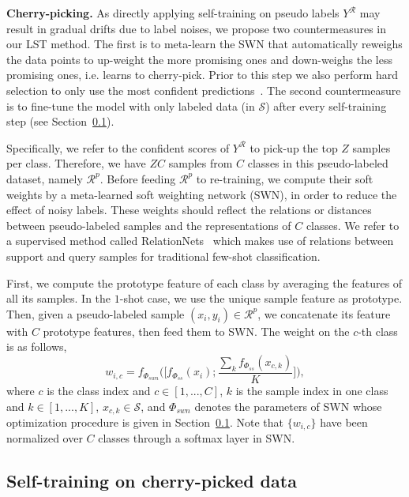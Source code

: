 \documentclass{article}
\newcommand{\myparagraph}[1]{\vspace{0.1em}\noindent\textbf{#1}}
\begin{document}
\myparagraph{Cherry-picking.}
As directly applying self-training on pseudo labels $Y^{\mathcal{R}}$ may result in gradual drifts due to label noises,
we propose two countermeasures in our LST method.
The first is to meta-learn the SWN that automatically reweighs the data points to up-weight the more promising ones and down-weighs the less promising ones, i.e. learns to cherry-pick.
Prior to this step we also perform hard selection to only use the most confident predictions~\cite{TrigueroGH15self_labeled}.
The second countermeasure is to fine-tune the model with only labeled data (in $\mathcal{S}$) after every self-training step (see Section~\ref{sec_retraining}). 


Specifically, we refer to the confident scores of $Y^{\mathcal{R}}$ to pick-up the top $Z$ samples per class. 
Therefore, we have $ZC$ samples from $C$ classes in this pseudo-labeled dataset, namely $\mathcal{R}^p$.
Before feeding $\mathcal{R}^p$ to re-training, we compute their soft weights by a meta-learned soft weighting network (SWN), in order to reduce the effect of noisy labels.
These weights should reflect the relations or distances between pseudo-labeled samples and the representations of $C$ classes. 
We refer to a supervised method called RelationNets~\cite{SungCVPR2018} which makes use of relations between support and query samples for traditional few-shot classification.


First, we compute the prototype feature of each class by averaging the features of all its samples.
In the $1$-shot case, we use the unique sample feature as prototype.
Then, given a pseudo-labeled sample $(x_i, y_i)\in \mathcal{R}^p$, we concatenate its feature with $C$ prototype features, then feed them to SWN. The weight on the $c$-th class is as follows,
\begin{equation} 
\label{soft_weights}
w_{i,c}=f_{\Phi_{swn}}\Big(\Big[f_{\Phi_{ss}}(x_i); \frac{\sum_{k}{f_{\Phi_{ss}}(x_{c, k})}}{K}\Big]\Big),
\end{equation}
where $c$ is the class index and $c \in [1,..., C]$, $k$ is the sample index in one class and $k \in [1,..., K]$, $x_{c, k} \in \mathcal{S}$, and $\Phi_{swn}$ denotes the parameters of SWN whose optimization procedure is given in Section~\ref{sec_retraining}.
Note that $\{w_{i,c}\}$ have been normalized over $C$ classes through a softmax layer in SWN.




\subsection{Self-training on cherry-picked data}
\label{sec_retraining}
\end{document}
